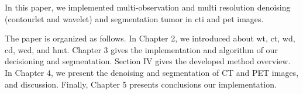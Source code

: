 In this paper, we implemented  multi-observation and multi resolution  denoising (contourlet and wavelet) and segmentation tumor in \gls{cti} and \gls{pet} images.

The paper is organized as follows. In Chapter 2, we introduced about \gls{wt}, \gls{ct}, \gls{wd}, \gls{cd}, \gls{wcd}, and \gls{hmt}. Chapter 3 gives the implementation and algorithm of our decisioning and segmentation. Section IV gives the developed method overview. In Chapter 4, we present the denoising and segmentation of CT and PET images, and discussion. Finally, Chapter 5 presents conclusions our implementation.

